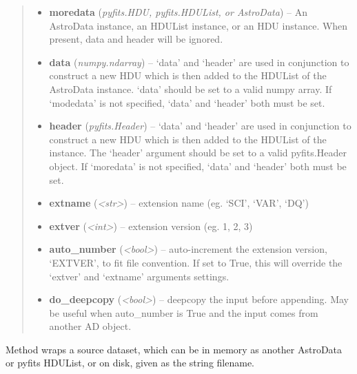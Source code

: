 \documentclass[letterpaper,10pt,english]{sphinxmanual}
\begin{document}
\begin{fulllineitems}
\begin{fulllineitems}
\begin{quote}
\begin{description}
\begin{itemize}
\item {} 
\textbf{moredata} (\emph{pyfits.HDU, pyfits.HDUList, or AstroData}) -- An AstroData instance, an HDUList instance, or
an HDU instance. When present, data and header will be
ignored.

\item {} 
\textbf{data} (\emph{numpy.ndarray}) -- `data' and `header' are used in conjunction to construct a
new HDU which is then added to the HDUList of the AstroData
instance. `data' should be set to a valid numpy array. 
If `modedata' is not specified, `data' and `header' both
must be set.

\item {} 
\textbf{header} (\emph{pyfits.Header}) -- `data' and `header' are used in conjunction to construct
a new HDU which is then added to the HDUList of the
instance. The `header' argument should be set to a valid
pyfits.Header object. If `moredata' is not specified,
`data' and `header' both must be set.

\item {} 
\textbf{extname} (\emph{\textless{}str\textgreater{}}) -- extension name (eg. `SCI', `VAR', `DQ')

\item {} 
\textbf{extver} (\emph{\textless{}int\textgreater{}}) -- extension version (eg. 1, 2, 3)

\item {} 
\textbf{auto\_number} (\emph{\textless{}bool\textgreater{}}) -- auto-increment the extension version, `EXTVER',
to fit file convention. If set to True, this will
override the `extver' and `extname' arguments
settings.

\item {} 
\textbf{do\_deepcopy} (\emph{\textless{}bool\textgreater{}}) -- deepcopy the input before appending. May be useful
when auto\_number is True and the input comes from
another AD object.

\end{itemize}

\end{description}\end{quote}

\end{fulllineitems}


\begin{fulllineitems}
\label{astro_class:astrodata.AstroData.AstroData.open}
Method wraps a source dataset, which can be in memory as another
AstroData or pyfits HDUList, or on disk, given as the string filename.


\end{fulllineitems}
\end{fulllineitems}
\end{document}
